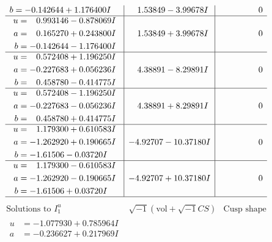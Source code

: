 \documentclass[1p]{elsarticle_modified}
\theoremstyle{definition}
\newcommand{\I}{\sqrt{-1}}
\begin{document}
$$\begin{array}{c|c|c}
\begin{aligned}
b &= -0.142644 + 1.176400 I\end{aligned}
 & \phantom{-}1.53849 - 3.99678 I & \phantom{-0.000000 } 0 \\ \hline\begin{aligned}
u &= \phantom{-}0.993146 - 0.878069 I \\
a &= \phantom{-}0.165270 + 0.243800 I \\
b &= -0.142644 - 1.176400 I\end{aligned}
 & \phantom{-}1.53849 + 3.99678 I & \phantom{-0.000000 } 0 \\ \hline\begin{aligned}
u &= \phantom{-}0.572408 + 1.196250 I \\
a &= -0.227683 + 0.056236 I \\
b &= \phantom{-}0.458780 - 0.414775 I\end{aligned}
 & \phantom{-}4.38891 - 8.29891 I & \phantom{-0.000000 } 0 \\ \hline\begin{aligned}
u &= \phantom{-}0.572408 - 1.196250 I \\
a &= -0.227683 - 0.056236 I \\
b &= \phantom{-}0.458780 + 0.414775 I\end{aligned}
 & \phantom{-}4.38891 + 8.29891 I & \phantom{-0.000000 } 0 \\ \hline\begin{aligned}
u &= \phantom{-}1.179300 + 0.610583 I \\
a &= -1.262920 + 0.190665 I \\
b &= -1.61506 - 0.03720 I\end{aligned}
 & -4.92707 - 10.37180 I & \phantom{-0.000000 } 0 \\ \hline\begin{aligned}
u &= \phantom{-}1.179300 - 0.610583 I \\
a &= -1.262920 - 0.190665 I \\
b &= -1.61506 + 0.03720 I\end{aligned}
 & -4.92707 + 10.37180 I & \phantom{-0.000000 } 0\\
 \hline 
 \end{array}$$\newpage$$\begin{array}{c|c|c}  
\text{Solutions to }I^u_{1}& \I (\text{vol} + \sqrt{-1}CS) & \text{Cusp shape}\\
 \hline 
\begin{aligned}
u &= -1.077930 + 0.785964 I \\
a &= -0.236627 + 0.217969 I \\

\end{aligned}
\end{array}$$
\end{document}
